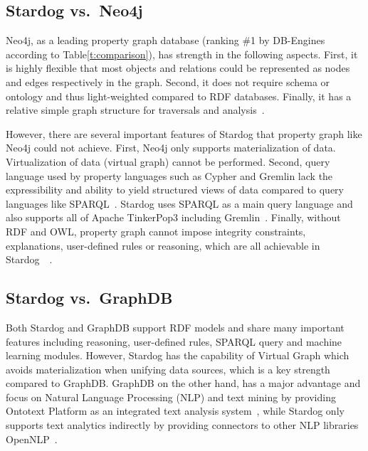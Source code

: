 	\subsection{Stardog vs.\ Neo4j}
		Neo4j, as a leading property graph database (ranking \#1 by DB-Engines 
		according to Table\ref{t:comparison}), has strength in the following 
		aspects. First, it is highly flexible that most objects and relations could 
		be represented as nodes and edges respectively in the graph. Second, it 
		does not require schema or ontology and thus light-weighted compared 
		to RDF databases. Finally, it has a relative simple graph structure for 
		traversals and 
		analysis~\cite{hid-sp18-405-robinson2013graphdatabase-stardog}. 
		
		However, there are several important features of Stardog that property 
		graph like Neo4j could not achieve. First, Neo4j only supports 
		materialization of data. Virtualization of data (virtual graph) cannot be 
		performed. Second, query language used by property languages such 
		as Cypher and Gremlin lack the expressibility and ability to yield 
		structured views of data compared to query languages like 
		SPARQL~\cite{hid-sp18-405-angles2008expre-stardog}. 
		Stardog uses SPARQL as a main query language and also supports all of 
		Apache TinkerPop3 including 
		Gremlin~\cite{hid-sp18-405-www-stardog-docs}. Finally, without RDF 
		and OWL, property graph cannot impose integrity constraints, 
		explanations, user-defined rules or reasoning, which are all achievable in 
		Stardog~\cite{hid-sp18-405-www-stardog-dbengines-neo4j}~\cite{hid-sp18-405-www-stardog-docs}.
	 
	\subsection{Stardog vs.\ GraphDB}
		Both Stardog and GraphDB support RDF models and share many 
		important features including reasoning, user-defined rules, SPARQL 
		query and machine learning modules. However, Stardog has the 
		capability of Virtual Graph which avoids materialization when unifying 
		data sources, which is a key strength compared to GraphDB.\@ 
		GraphDB on the other hand, has a major advantage and focus on 
		Natural Language Processing (NLP) and text mining by providing 
		Ontotext Platform as an integrated text analysis 
		system~\cite{hid-sp18-405-www-stardog-ontotext}, while Stardog only 
		supports text analytics indirectly by providing connectors to other NLP 
		libraries OpenNLP~\cite{hid-sp18-405-www-stardog-docs}. 
		
